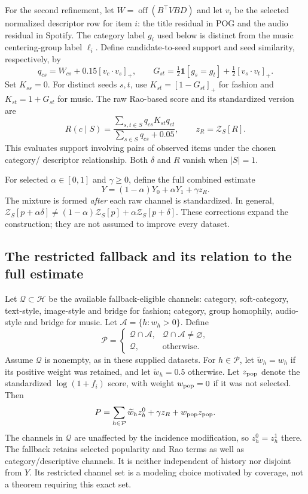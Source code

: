 \documentclass[11pt,a4paper]{article}
\newcommand{\off}{\operatorname{off}}
\newcommand{\pos}[1]{\left[#1\right]_+}
\newcommand{\Z}{\mathcal Z_S}
\begin{document}
For the second refinement, let $W=\off(B^\top VBD)$ and let $v_i$ be the selected
normalized descriptor row for item $i$: the title residual in POG and the audio
residual in Spotify. The category label $g_i$ used below is distinct from the music
centering-group label $\ell_i$. Define
candidate-to-seed support and seed similarity, respectively, by
\[
 q_{cs}=W_{cs}+0.15\pos{v_c\cdot v_s},\qquad
 G_{st}=\tfrac12\mathbf1[g_s=g_t]+\tfrac12\pos{v_s\cdot v_t}.
\]
Set $K_{ss}=0$. For distinct seeds $s,t$, use $K_{st}=\pos{1-G_{st}}$ for fashion
and $K_{st}=1+G_{st}$ for music. The raw Rao-based score and its standardized version are
\begin{equation}
 R(c\mid S)=\frac{\sum_{s,t\in S}q_{cs}K_{st}q_{ct}}
                    {\sum_{s\in S}q_{cs}+0.05},\qquad z_R=\Z[R].
\end{equation}
This evaluates support involving pairs of observed items under the chosen category/
descriptor relationship. Both $\delta$ and $R$ vanish when $|S|=1$.

For selected $\alpha\in[0,1]$ and $\gamma\geq0$, define the full combined estimate
\begin{equation}\label{Y}
 Y=(1-\alpha)Y_0+\alpha Y_1+\gamma z_R.
\end{equation}
The mixture is formed \emph{after} each raw channel is standardized. In general,
$\Z[p+\alpha\delta]\ne(1-\alpha)\Z[p]+\alpha\Z[p+\delta]$.
These corrections expand the construction; they are not assumed to improve every dataset.

\subsection{The restricted fallback and its relation to the full estimate}
Let $\mathcal Q\subset\mathcal H$ be the available fallback-eligible channels:
category, soft-category, text-style, image-style and bridge for fashion; category,
group homophily, audio-style and bridge for music. Let
$\mathcal A=\{h:w_h>0\}$. Define
\[
 \mathcal P=\begin{cases}
 \mathcal Q\cap\mathcal A,&\mathcal Q\cap\mathcal A\ne\varnothing,\\
 \mathcal Q,&\text{otherwise}.
 \end{cases}
\]
Assume $\mathcal Q$ is nonempty, as in these supplied datasets. For $h\in\mathcal P$,
let $\widetilde w_h=w_h$ if its positive weight was retained, and let
$\widetilde w_h=0.5$ otherwise. Let $z_{\rm pop}$ denote the standardized
$\log(1+f_i)$ score, with weight $w_{\rm pop}=0$ if it was not selected. Then
\begin{equation}\label{P}
 P=\sum_{h\in\mathcal P}\widetilde w_hz_h^0+\gamma z_R+w_{\rm pop}z_{\rm pop}.
\end{equation}
The channels in $\mathcal Q$ are unaffected by the incidence modification, so
$z_h^0=z_h^1$ there. The fallback retains selected popularity and Rao terms as well
as category/descriptive channels. It is neither independent of history nor disjoint
from $Y$. Its restricted channel set is a modeling choice motivated by coverage,
not a theorem requiring this exact set.
\end{document}
